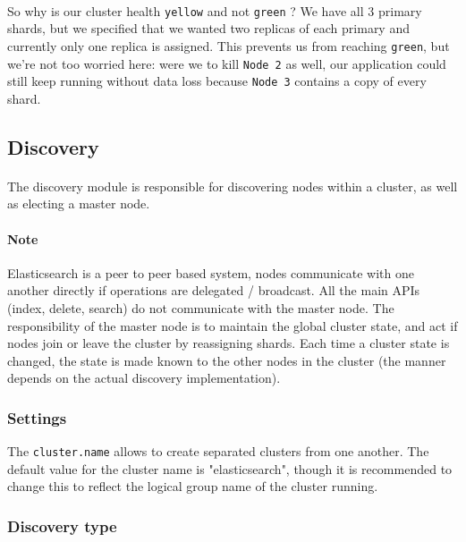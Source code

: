 \documentclass{article}%
\begin{document}
\paragraph{} So why is our cluster health \texttt{yellow} and not \texttt{green} ? We have all 3 primary shards, but we specified that we wanted two replicas of each primary and currently only one replica is assigned. This prevents us from reaching \texttt{green}, but we’re not too worried here: were we to kill \texttt{Node 2} as well, our application could still keep running without data loss because \texttt{Node 3} contains a copy of every shard.

\subsection{Discovery}

\paragraph{} The discovery module is responsible for discovering nodes within a cluster, as well as electing a master node.

\paragraph{Note} Elasticsearch is a peer to peer based system, nodes communicate with one another directly if operations are delegated / broadcast. All the main APIs (index, delete, search) do not communicate with the master node. The responsibility of the master node is to maintain the global cluster state, and act if nodes join or leave the cluster by reassigning shards. Each time a cluster state is changed, the state is made known to the other nodes in the cluster (the manner depends on the actual discovery implementation).

\subsubsection{Settings}

The \texttt{cluster.name} allows to create separated clusters from one another. The default value for the cluster name is "elasticsearch", though it is recommended to change this to reflect the logical group name of the cluster running.

\subsubsection{Discovery type}
\end{document}
